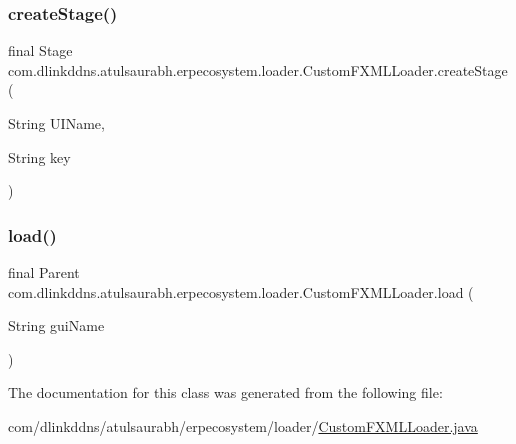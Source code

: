 \subsubsection{\texorpdfstring{create\+Stage()}{createStage()}}
{\footnotesize\ttfamily final Stage com.\+dlinkddns.\+atulsaurabh.\+erpecosystem.\+loader.\+Custom\+F\+X\+M\+L\+Loader.\+create\+Stage (\begin{DoxyParamCaption}\item[{String}]{U\+I\+Name,  }\item[{String}]{key }\end{DoxyParamCaption})}

\mbox{\label{classcom_1_1dlinkddns_1_1atulsaurabh_1_1erpecosystem_1_1loader_1_1_custom_f_x_m_l_loader_a7e3c0b074c43866c2950964b208b2bef}} 
\subsubsection{\texorpdfstring{load()}{load()}}
{\footnotesize\ttfamily final Parent com.\+dlinkddns.\+atulsaurabh.\+erpecosystem.\+loader.\+Custom\+F\+X\+M\+L\+Loader.\+load (\begin{DoxyParamCaption}\item[{String}]{gui\+Name }\end{DoxyParamCaption})}



The documentation for this class was generated from the following file\+:\begin{DoxyCompactItemize}
\item 
com/dlinkddns/atulsaurabh/erpecosystem/loader/\mbox{\hyperlink{_custom_f_x_m_l_loader_8java}{Custom\+F\+X\+M\+L\+Loader.\+java}}\end{DoxyCompactItemize}
